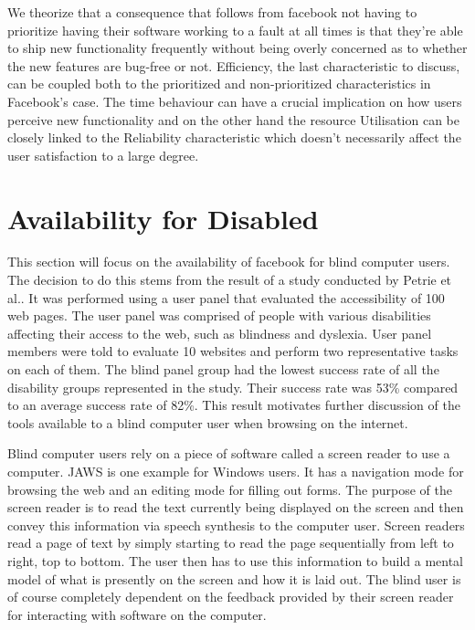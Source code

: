 \documentclass[conference]{IEEEtran}
\begin{document}
We theorize that a consequence that follows from facebook not having to prioritize having their software working to a fault at all times is that they’re able to ship new functionality frequently without being overly concerned as to whether the new features are bug-free or not. Efficiency, the last characteristic to discuss, can be coupled both to the prioritized and non-prioritized characteristics in Facebook’s case. The time behaviour can have a crucial implication on how users perceive new functionality and on the other hand the resource Utilisation can be closely linked to the Reliability characteristic which doesn’t necessarily affect the user satisfaction to a large degree. 

\section{Availability for Disabled}
\label{availability}


This section will focus on the availability of facebook for blind computer users. The decision to do this stems from the result of a study conducted by Petrie et al.\cite{petrie2004}. It was performed using a user panel that evaluated the accessibility of 100 web pages. The user panel was comprised of people with various disabilities affecting their access to the web, such as blindness and dyslexia. User panel members were told to evaluate 10 websites and perform two representative tasks on each of them. The blind panel group had the lowest success rate of all the disability groups represented in the study. Their success rate was 53\% compared to an average success rate of 82\%. This result motivates further discussion of the tools available to a blind computer user when browsing on the internet.

Blind computer users rely on a piece of software called a screen reader to use a computer. JAWS\cite{jaws} is one example for Windows users. It has a navigation mode for browsing the web and an editing mode for filling out forms. The purpose of the screen reader is to read the text currently being displayed on the screen and then convey this information via speech synthesis to the computer user. Screen readers read a page of text by simply starting to read the page sequentially from left to right, top to bottom. The user then has to use this information to build a mental model of what is presently on the screen and how it is laid out. The blind user is of course completely dependent on the feedback provided by their screen reader for interacting with software on the computer.
\end{document}
